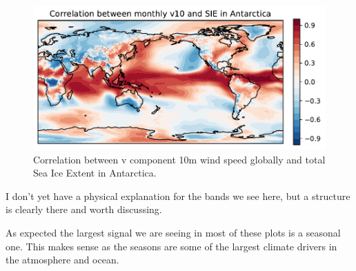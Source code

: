 \begin{figure}[H]
    \centering
    \includegraphics[width=\textwidth]{Images/global_correlation_monthly_v10_sie.pdf}
    \caption{Correlation between v component 10m wind speed globally and total Sea Ice Extent in Antarctica.}
    \label{fig:v10_sie_corr}
\end{figure}

I don't yet have a physical explanation for the bands we see here, but a structure is clearly there and worth discussing.

As expected the largest signal we are seeing in most of these plots is a seasonal one. This makes sense as the seasons are some of the largest climate drivers in the atmosphere and ocean.